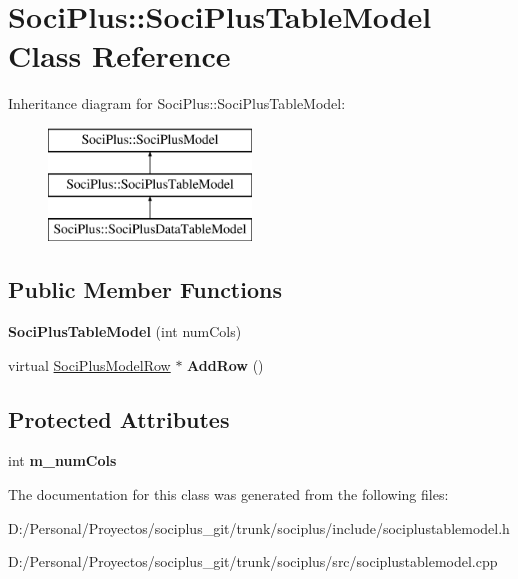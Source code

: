 \hypertarget{class_soci_plus_1_1_soci_plus_table_model}{\section{Soci\+Plus\+:\+:Soci\+Plus\+Table\+Model Class Reference}
\label{class_soci_plus_1_1_soci_plus_table_model}
}
Inheritance diagram for Soci\+Plus\+:\+:Soci\+Plus\+Table\+Model\+:\begin{figure}[H]
\begin{center}
\leavevmode
\includegraphics[height=3.000000cm]{class_soci_plus_1_1_soci_plus_table_model}
\end{center}
\end{figure}
\subsection*{Public Member Functions}
\begin{DoxyCompactItemize}
\item 
\hypertarget{class_soci_plus_1_1_soci_plus_table_model_aeb5acf4498ce2936d2ddde7a9258c4d1}{{\bfseries Soci\+Plus\+Table\+Model} (int num\+Cols)}\label{class_soci_plus_1_1_soci_plus_table_model_aeb5acf4498ce2936d2ddde7a9258c4d1}

\item 
\hypertarget{class_soci_plus_1_1_soci_plus_table_model_a184459856f73ae5a7dc670f60287b034}{virtual \hyperlink{class_soci_plus_1_1_soci_plus_model_row}{Soci\+Plus\+Model\+Row} $\ast$ {\bfseries Add\+Row} ()}\label{class_soci_plus_1_1_soci_plus_table_model_a184459856f73ae5a7dc670f60287b034}

\end{DoxyCompactItemize}
\subsection*{Protected Attributes}
\begin{DoxyCompactItemize}
\item 
\hypertarget{class_soci_plus_1_1_soci_plus_table_model_a06ba07e3b3a6e8cbfcf990cbbf754644}{int {\bfseries m\+\_\+num\+Cols}}\label{class_soci_plus_1_1_soci_plus_table_model_a06ba07e3b3a6e8cbfcf990cbbf754644}

\end{DoxyCompactItemize}


The documentation for this class was generated from the following files\+:\begin{DoxyCompactItemize}
\item 
D\+:/\+Personal/\+Proyectos/sociplus\+\_\+git/trunk/sociplus/include/sociplustablemodel.\+h\item 
D\+:/\+Personal/\+Proyectos/sociplus\+\_\+git/trunk/sociplus/src/sociplustablemodel.\+cpp\end{DoxyCompactItemize}
